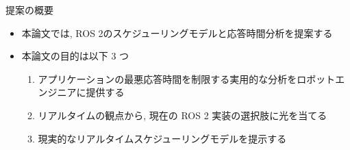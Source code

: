 

\begin{frame}{提案の概要}
    \begin{itemize}
        \item 本論文では, ROS 2のスケジューリングモデルと応答時間分析を提案する
        \item 本論文の目的は以下 3 つ
        \begin{enumerate}
            \item アプリケーションの最悪応答時間を制限する実用的な分析をロボットエンジニアに提供する
            \item リアルタイムの観点から, 現在の ROS 2 実装の選択肢に光を当てる
            \item 現実的なリアルタイムスケジューリングモデルを提示する
        \end{enumerate}
    \end{itemize}
\end{frame}
